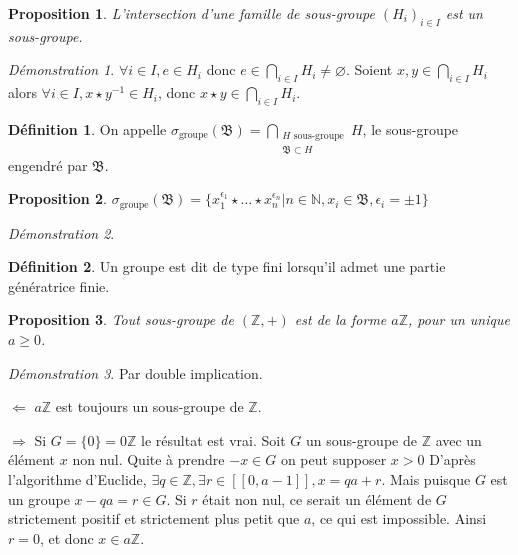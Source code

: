 \documentclass[a4paper, 11pt, french]{book}
\newenvironment{itemise}{\itemize}{\enditemize}
\let\colour=\color
\theoremstyle{plain} %
\newtheorem{proposition}{Proposition}
\theoremstyle{definition} %
\newtheorem{definition}{Définition}
\theoremstyle{remark} %
\newtheorem*{demonstration}{Démonstration}
\newcommand{\1}{\mathds{1}}
\newcommand\vide{\varnothing}
\newcommand{\supegal}{\geqslant}
\newcommand{\inv}[1]{#1^{-1}}
\newcommand{\N}{\mathbb{N}}
\newcommand{\Z}{\mathbb{Z}}
\begin{document}
\begin{proposition}
	L'intersection d'une famille de sous-groupe $(H_i)_{i\in I}$ est un sous-groupe.
\end{proposition}

\begin{demonstration}
	$\forall i\in I, e\in H_i$ donc $e\in\bigcap_{i\in I}H_i\neq\vide$.
	Soient $x, y\in\bigcap_{i\in I}H_i$ alors $\forall i\in I, x\star\inv{y}\in H_i$, donc $x\star y\in\bigcap_{i\in I}H_i$.
\end{demonstration}

\begin{definition}
	On appelle $\sigma_\text{groupe}(\mathfrak{B})=\bigcap_{\substack{H\text{ sous-groupe}\\\mathfrak{B}\subset H}}H$, le sous-groupe engendré par $\mathfrak{B}$.
\end{definition}

\begin{proposition}
	$\sigma_\text{groupe}(\mathfrak{B})=\{x_1^{\epsilon_1}\star\dots\star x_n^{\epsilon_n} | n\in\N, x_i\in\mathfrak{B}, \epsilon_i=\pm1\}$
\end{proposition}

\begin{demonstration}
	\colour{red}{À démontrer}
\end{demonstration}

\begin{definition}
	Un groupe est dit de type fini lorsqu'il admet une partie génératrice finie.
\end{definition}

\begin{proposition}
	Tout sous-groupe de $(\Z, +)$ est de la forme $a\Z$, pour un unique $a\supegal0$.
\end{proposition}

\begin{demonstration}
	Par double implication.
	\begin{itemise}
		\item[$\Leftarrow$] $a\Z$ est toujours un sous-groupe de $\Z$.
		\item[$\Rightarrow$] Si $G=\{0\}=0\Z$ le résultat est vrai.
		Soit $G$ un sous-groupe de $\Z$ avec un élément $x$ non nul.
		Quite à prendre $-x\in G$ on peut supposer $x>0$
		D'après l'algorithme d'Euclide, $\exists q\in\Z, \exists r\in[\![0, a-1]\!], x = qa + r$.
		Mais puisque $G$ est un groupe $x-qa=r\in G$.
		Si $r$ était non nul, ce serait un élément de $G$ strictement positif et strictement plus petit que $a$, ce qui est impossible.
		Ainsi $r=0$, et donc $x\in a\Z$.
	\end{itemise}
\end{demonstration}
\end{document}
